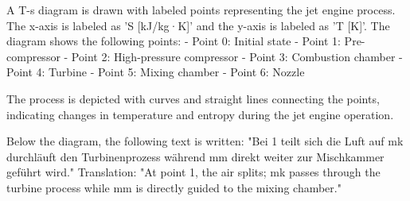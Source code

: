 A T-s diagram is drawn with labeled points representing the jet engine process. The x-axis is labeled as 'S [kJ/kg·K]' and the y-axis is labeled as 'T [K]'. The diagram shows the following points:  
- Point 0: Initial state  
- Point 1: Pre-compressor  
- Point 2: High-pressure compressor  
- Point 3: Combustion chamber  
- Point 4: Turbine  
- Point 5: Mixing chamber  
- Point 6: Nozzle  

The process is depicted with curves and straight lines connecting the points, indicating changes in temperature and entropy during the jet engine operation.  

Below the diagram, the following text is written:  
"Bei 1 teilt sich die Luft auf mk durchläuft den Turbinenprozess während mm direkt weiter zur Mischkammer geführt wird."  
Translation: "At point 1, the air splits; mk passes through the turbine process while mm is directly guided to the mixing chamber."